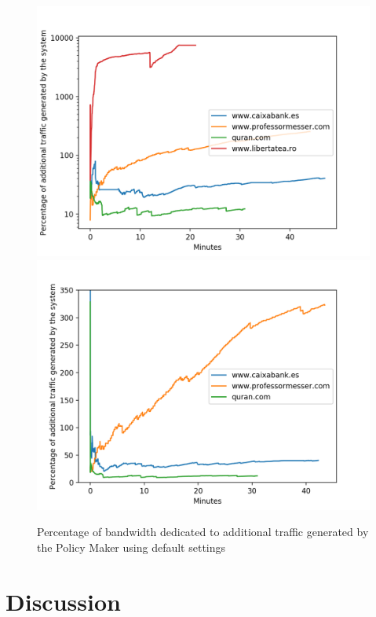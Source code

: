 \begin{description}
\begin{figure}[h]
	\centering
	\includegraphics[width=\textwidth]{imgs/netword_usage_plot.png}
	\includegraphics[width=\textwidth]{imgs/netword_usage_long_plot.png}
	\caption{Percentage of bandwidth dedicated to additional traffic generated by the Policy Maker using default settings}
	\label{fig:standarUsage}
\end{figure}


\section{Discussion}



\end{description}
